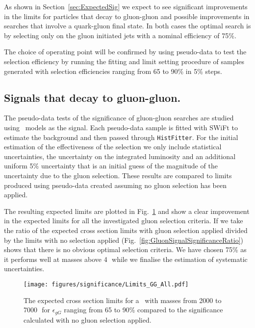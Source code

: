 
As shown in Section~\ref{sec:ExpectedSig} we expect to see significant improvements in the limits for 
particles that decay to gluon-gluon and possible improvements in searches that involve a quark-gluon 
final state. In both cases the optimal search is by selecting only on the gluon initiated jets with a 
nominal efficiency of 75\%.  

The choice of operating point will be confirmed by using pseudo-data to test 
the selection efficiency by 
running the fitting and limit setting procedure of samples generated with selection efficiencies ranging from 
65 to 90\% in 5\% steps. 

\subsection{Signals that decay to gluon-gluon.}


The pseudo-data tests of the significance of gluon-gluon searches are studied using  \Hprime\ models as the signal. 
Each pseudo-data sample is fitted with SWiFt to estimate the background and then passed through \texttt{HistFitter}. 
For the initial estimation of the effectiveness of the selection we only include statistical uncertainties, 
the uncertainty on the integrated luminosity and an additional uniform 5\% uncertainty that is an initial 
guess of the magnitude of the uncertainty due to the gluon selection.  These results are compared to limits 
produced using pseudo-data created assuming no gluon selection has been applied. 

The resulting expected limits are plotted in Fig.~\ref{fig:GluonSignalSignificancePD}  and show a clear 
improvement in the expected limits for all the investigated gluon selection criteria. If we take the 
ratio of the expected cross section limits with gluon selection applied divided by the limits with no 
selection applied (Fig.~\ref{fig:GluonSignalSignificanceRatio}) shows that there is no obvious optimal
selection criteria. We have chosen 75\% as it performs well at masses above 4\,\TeV\ while we finalise 
the estimation of systematic uncertainties. 


\begin{figure}[htb]
 \centering
\texttt{[image: figures/significance/Limits\_GG\_All.pdf]}
\caption{ The expected cross section limits for a \Hprime\ with masses from 2000 to 7000\,\GeV\ 
for $\epsilon_{gG}$ ranging from 65 to 90\% compared to the significance calculated with 
   no gluon selection applied.
  \label{fig:GluonSignalSignificancePD}}
\end{figure}

